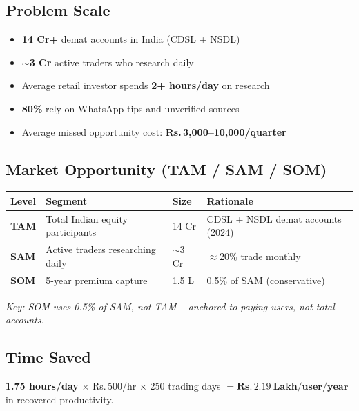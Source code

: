 \documentclass[11pt, a4paper]{article}
\newcommand{\Rs}{Rs.\,}
\begin{document}
\subsection{Problem Scale}

\begin{itemize}[leftmargin=1.6em, itemsep=2pt]
  \item \textbf{14 Cr+} demat accounts in India (CDSL + NSDL)
  \item \textbf{$\sim$3 Cr} active traders who research daily
  \item Average retail investor spends \textbf{2+ hours/day} on research
  \item \textbf{80\%} rely on WhatsApp tips and unverified sources
  \item Average missed opportunity cost: \textbf{\Rs{}3,000--10,000/quarter}
\end{itemize}

\subsection{Market Opportunity (TAM / SAM / SOM)}

\begin{center}
\small
\begin{tabular}{L{1.5cm} L{5cm} C{2.5cm} L{4.5cm}}
  \toprule
  \textbf{Level} & \textbf{Segment} & \textbf{Size} & \textbf{Rationale} \\
  \midrule
  \textbf{TAM} & Total Indian equity participants & 14 Cr & CDSL + NSDL demat accounts (2024) \\
  \textbf{SAM} & Active traders researching daily & $\sim$3 Cr & $\approx$20\% trade monthly \\
  \textbf{SOM} & 5-year premium capture & 1.5 L & 0.5\% of SAM (conservative) \\
  \bottomrule
\end{tabular}
\end{center}

\noindent
\small\textit{Key: SOM uses 0.5\% of SAM, not TAM -- anchored to paying users, not total accounts.}

\subsection{Time Saved}

\begin{greenbox}[title={Time Value Recovered Per User}]
\textbf{1.75 hours/day} $\times$ \Rs{}500/hr $\times$ 250 trading days
$= \mathbf{\Rs{}2.19\ Lakh/user/year}$ in recovered productivity.
\end{greenbox}
\end{document}
